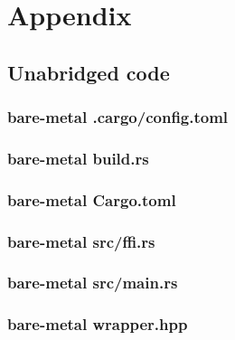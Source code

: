 \chapter{Appendix}
\label{chap:appendix}

\section{Unabridged code}

\subsection{bare-metal .cargo/config.toml}
\label{sec:appendix:code:bare-metal:config}



\subsection{bare-metal build.rs}
\label{sec:appendix:code:bare-metal:build}



\subsection{bare-metal Cargo.toml}
\label{sec:appendix:code:bare-metal:cargo}



\subsection{bare-metal src/ffi.rs}
\label{sec:appendix:code:bare-metal:ffi}



\subsection{bare-metal src/main.rs}
\label{sec:appendix:code:bare-metal:main}



\subsection{bare-metal wrapper.hpp}
\label{sec:appendix:code:bare-metal:wrapper}

